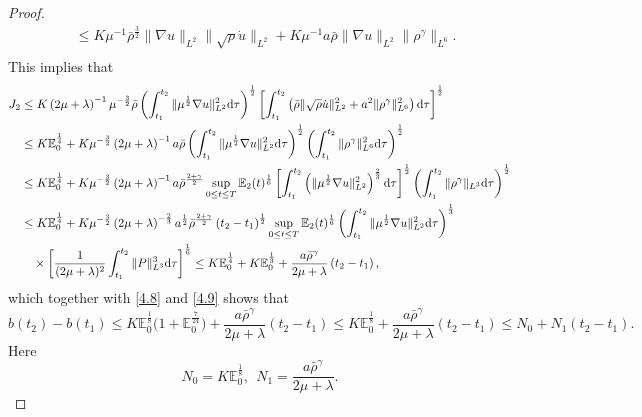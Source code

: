 \documentclass[11pt]{article}
\begin{document}
\begin{proof}
$$\begin{aligned}
& \leq K \mu^{-1} \bar{\rho}^{\frac{3}{2}} \|\nabla u\|_{L^2} \|\sqrt{\rho} \dot{u}\|_{L^2} + K \mu^{-1} a \bar{\rho} \|\nabla u\|_{L^2} \|\rho^{\gamma}\|_{L^6}. \\
\end{aligned}
$$
This implies that
\begin{align*}
J_2
& \leq K \left(2 \mu + \lambda \right)^{-1} \mu^{-\frac{3}{2}} \bar{\rho} \left(\int^{t_2}_{t_1} \|\mu^{\frac{1}{2}}\nabla u\|_{L^2}^2 \mathrm{d} \tau \right)^{\frac{1}{2}} \left[\int^{t_2}_{t_1} \left(\bar{\rho} \|\sqrt{\rho} \dot{u}\|_{L^2}^2 + a^2 \|\rho^{\gamma}\|_{L^6}^2 \right)\mathrm{d} \tau \right]^{\frac{1}{2}}\notag\\
& \leq K \mathbb{E}_0^{\frac{1}{4}} + K \mu^{-\frac{3}{2}} \left(2 \mu + \lambda \right)^{-1} a \bar{\rho} \left( \int^{t_2}_{t_1} \|\mu^{\frac{1}{2}}\nabla u\|_{L^2}^2 \mathrm{d} \tau \right)^{\frac{1}{2}} \left(\int^{t_2}_{t_1} \|\rho^{\gamma}\|_{L^6}^2\mathrm{d} \tau \right)^{\frac{1}{2}}\notag\\
& \leq K \mathbb{E}_0^{\frac{1}{4}}  + K \mu^{-\frac{3}{2}} \left(2 \mu + \lambda \right)^{-1} a \bar{\rho}^{\frac{2 + \gamma}{2}} \sup_{0 \leq t \leq T} \mathbb{E}_2(t)^{\frac{1}{6}} \left[\int^{t_2}_{t_1} \left(\|\mu^{\frac{1}{2}}\nabla u\|_{L^2}^2 \right)^{\frac{2}{3}} \mathrm{d} \tau \right]^{\frac{1}{2}} \left(\int^{t_2}_{t_1} \|\rho^{\gamma}\|_{L^3}\mathrm{d} \tau \right)^{\frac{1}{2}}\notag\\
& \leq K \mathbb{E}_0^{\frac{1}{4}}  + K \mu^{-\frac{3}{2}} \left(2 \mu + \lambda \right)^{-\frac{2}{3}} a^{\frac{1}{2}} \bar{\rho}^{\frac{2 + \gamma}{2}}  \left( t_2 - t_1 \right)^{\frac{1}{2}} \sup_{0 \leq t \leq T} \mathbb{E}_2(t)^{\frac{1}{6}} \left(\int^{t_2}_{t_1} \|\mu^{\frac{1}{2}}\nabla u\|_{L^2}^2 \mathrm{d} \tau \right)^{\frac{1}{3}}\notag \\
& \quad \times\left[\frac{1}{(2 \mu + \lambda )^2} \int^{t_2}_{t_1} \|P\|_{L^3}^3 \mathrm{d} \tau \right]^{\frac{1}{6}} \leq K \mathbb{E}_0^{\frac{1}{4}} + K \mathbb{E}_0^{\frac{1}{3}} + \frac{a \bar{\rho}^{\gamma}}{2 \mu + \lambda } \left( t_2 - t_1 \right),
\end{align*}
which together with \eqref{4.8} and \eqref{4.9} shows that
$$
b(t_2) - b(t_1)
\leq K\mathbb{E}_0^{\frac{1}{8}} \Big(1 + \mathbb{E}_0^{\frac{7}{24}} \Big) + \frac{a \bar{\rho}^{\gamma}}{2 \mu + \lambda } \left( t_2 - t_1 \right) \leq K \mathbb{E}_0^{\frac{1}{8}} + \frac{a \bar{\rho}^{\gamma}}{2 \mu + \lambda } \left( t_2 - t_1 \right) \leq N_0 + N_1 \left( t_2 - t_1 \right).
$$
Here
$$
N_0 = K \mathbb{E}_0^{\frac{1}{8}}, \ \ N_1 = \frac{a \bar{\rho}^{\gamma}}{2 \mu + \lambda }.
$$


\end{proof}
\end{document}
